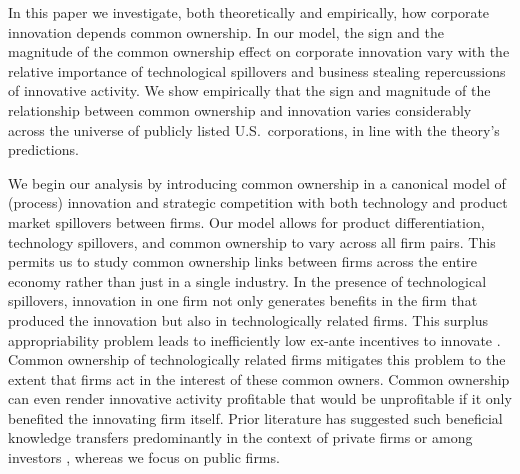 \documentclass[12pt]{article}
\begin{document}
In this paper we investigate, both theoretically and empirically, how corporate innovation depends common ownership. In our model, the sign and the magnitude of the common ownership effect on corporate innovation vary with the relative importance of technological spillovers and business stealing repercussions of innovative activity. We show empirically that the sign and magnitude of the relationship between common ownership and innovation varies considerably across the universe of publicly listed U.S.~corporations, in line with the theory's predictions. 

We begin our analysis by introducing common ownership in a canonical model of (process) innovation and strategic competition with both technology and product market spillovers between firms. Our model allows for product differentiation, technology spillovers, and common ownership to vary across all firm pairs. This permits us to study common ownership links between firms across the entire economy rather than just in a single industry. In the presence of technological spillovers, innovation in one firm not only generates benefits in the firm that produced the innovation but also in technologically related firms. This surplus appropriability problem leads to inefficiently low ex-ante incentives to innovate \citep{bolton1999,jones2000too,arora2021knowledge}. Common ownership of technologically related firms mitigates this problem to the extent that firms act in the interest of these common owners. Common ownership can even render innovative activity profitable that would be unprofitable if it only benefited the innovating firm itself. %
Prior literature has suggested such beneficial knowledge transfers predominantly in the context of private firms \citep{lindsey2008,eldar2020common,gonzalez2020exchanges} or among investors \citep{stein2008conversations,botelho2018here}, whereas we focus on public firms.
\end{document}
